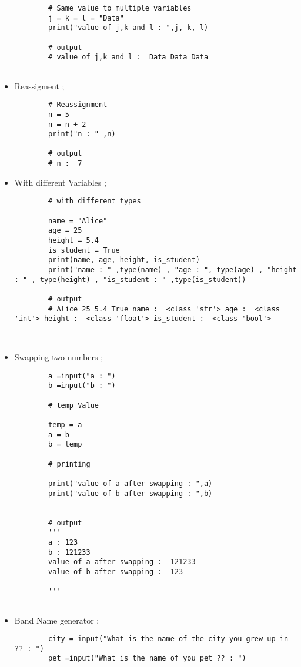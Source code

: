 \documentclass[a4paper,11pt]{article}
\theoremstyle{mytheor}
\begin{document}
\begin{itemize}
	\begin{lstlisting}
		# Same value to multiple variables
		j = k = l = "Data"
		print("value of j,k and l : ",j, k, l)
		
		# output
		# value of j,k and l :  Data Data Data
		
	\end{lstlisting}
	
	\item Reassigment ;
	
	\begin{lstlisting}
		# Reassignment
		n = 5
		n = n + 2
		print("n : " ,n)
		
		# output
		# n :  7
	\end{lstlisting}
	
	\item With different Variables ;
	
	\begin{lstlisting}
		# with different types
		
		name = "Alice"
		age = 25
		height = 5.4
		is_student = True
		print(name, age, height, is_student)
		print("name : " ,type(name) , "age : ", type(age) , "height : " , type(height) , "is_student : " ,type(is_student))
		
		# output
		# Alice 25 5.4 True name :  <class 'str'> age :  <class 'int'> height :  <class 'float'> is_student :  <class 'bool'>
		
		
	\end{lstlisting}
	
	\item Swapping two numbers ;
	
	\begin{lstlisting}
		a =input("a : ")
		b =input("b : ")
		
		# temp Value
		
		temp = a
		a = b
		b = temp
		
		# printing
		
		print("value of a after swapping : ",a)
		print("value of b after swapping : ",b)
		
		
		# output
		'''
		a : 123
		b : 121233
		value of a after swapping :  121233
		value of b after swapping :  123
		
		'''
		
	\end{lstlisting}
	
	\item Band Name generator ;
	
	\begin{lstlisting}
		city = input("What is the name of the city you grew up in ?? : ")
		pet =input("What is the name of you pet ?? : ")
		

\end{lstlisting}
\end{itemize}
\end{document}
